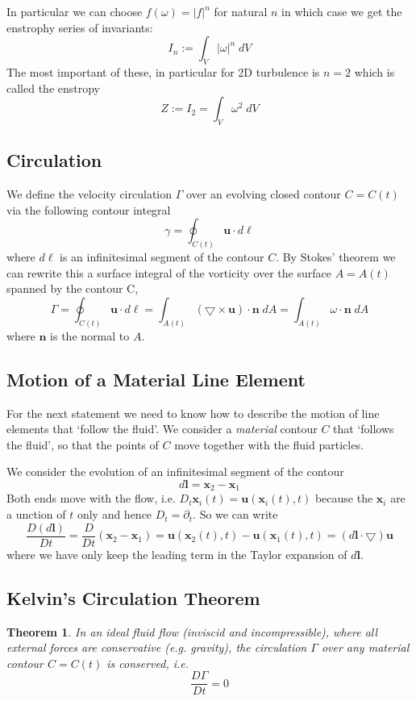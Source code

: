\documentclass[11pt]{article}
\newcommand{\grad}{\bigtriangledown}
\newcommand{\dl}{d\ell}
\newcommand{\defeq}{:=}
\newcommand{\mv}[1]{\bm{#1}}
\newcommand{\mdf}[1]{{\color{red}#1}}
\newcommand{\abs}[1]{\left|#1\right|}
\newtheorem{theorem}{Theorem}[section]
\begin{document}
In particular we can choose $f(\omega)=\abs{f}^n$ for natural $n$ in which case we get the \mdf{enstrophy series of invariants}:
$$I_n\defeq\int_V \abs{\omega}^n\;dV$$
The most important of these, in particular for 2D turbulence is $n=2$ which is called the \mdf{enstropy}
$$Z\defeq I_2 = \int_V \omega^2\;dV$$

\subsection{Circulation}
We define the \mdf{velocity circulation} $\Gamma$ over an evolving closed contour $C=C(t)$ via the following contour integral
$$\gamma=\oint_{C(t)}\mv{u}\cdot\dl$$
where $\dl$ is an infinitesimal segment of the contour $C$.
By Stokes' theorem we can rewrite this a surface integral of the vorticity over the surface $A=A(t)$ spanned by the contour C,
$$\Gamma=\oint_{C(t)} \mv{u}\cdot\dl=\int_{A(t)}(\grad\times\mv{u})\cdot\mv{n}\;dA=\int_{A(t)}\omega\cdot\mv{n}\;dA$$
where $\mv{n}$ is the normal to $A$.
\subsection{Motion of a Material Line Element}
For the next statement we need to know how to describe the motion of line elements that `follow the fluid'. We consider a \emph{material} contour $C$ that `follows the fluid', so that the points of $C$ move together with the fluid particles.

We consider the evolution of an infinitesimal segment of the contour
\[
	d\mv{l}= \mv{x}_2 - \mv{x}_1
\]
Both ends move with the flow, i.e. $D_t{\mv{x}_i}(t)= \mv{u}(\mv{x}_i(t), t)$ because the $\mv{x}_i$ are a unction of $t$ only and hence $D_t=\partial_t$.
So we can write
\[
	\frac{D(d\mv{l})}{Dt}= \frac{D}{Dt}(\mv{x}_2 - \mv{x}_1) = \mv{u}(\mv{x}_2(t), t) - \mv{u}(\mv{x}_1(t), t) = (d\mv{l} \cdot\grad)\mv{u}
\]
where we have only keep the leading term in the Taylor expansion of $d\mv{l}$.

\subsection{Kelvin's Circulation Theorem}
\begin{theorem}
In an ideal fluid flow (inviscid and incompressible), where all external forces are conservative (e.g. gravity), the circulation $\Gamma$ over any material contour $C=C(t)$ is conserved, i.e.
\[
	\frac{D\Gamma}{Dt}=0
\]
\end{theorem}
\end{document}
